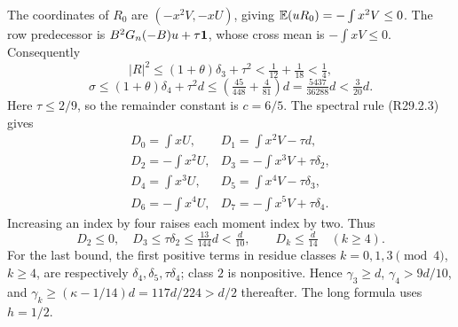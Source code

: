 The coordinates of \(R_0\) are \((-x^2V,-xU)\), giving
\(\mathbb E(uR_0)=-\int x^2V\le0\). The row predecessor is
\(B^2G_n(-B)u+\tau\mathbf1\), whose cross mean is
\(-\int xV\le0\). Consequently
\[
 |R|^2\le(1+\theta)\delta_3+\tau^2
 <\tfrac1{12}+\tfrac1{18}<\tfrac14,
\]
\begin{equation}\tag{R31.8.3}\label{eq:oc:R31:8.3}
 \sigma\le(1+\theta)\delta_4+\tau^2d
 \le\left(\tfrac{45}{448}+\tfrac4{81}\right)d
 =\tfrac{5437}{36288}d<\tfrac3{20}d.
\end{equation}
Here \(\tau\le2/9\), so the remainder constant is \(c=6/5\).
The spectral rule (R29.2.3) gives
\begin{equation}\tag{R31.8.4}\label{eq:oc:R31:8.4}
 \begin{array}{ll}
 D_0=\int xU,&D_1=\int x^2V-\tau d,\\
 D_2=-\int x^2U,&D_3=-\int x^3V+\tau\delta_2,\\
 D_4=\int x^3U,&D_5=\int x^4V-\tau\delta_3,\\
 D_6=-\int x^4U,&D_7=-\int x^5V+\tau\delta_4.
 \end{array}
\end{equation}
Increasing an index by four raises each moment index by two. Thus
\begin{equation}\tag{R31.8.5}\label{eq:oc:R31:8.5}
 D_2\le0,\quad D_3\le\tau\delta_2\le\tfrac{13}{144}d<\tfrac d{10},
 \qquad D_k\le\tfrac d{14}\quad(k\ge4).
\end{equation}
For the last bound, the first positive terms in residue classes
\(k=0,1,3\pmod4\), \(k\ge4\), are respectively
\(\delta_4,\delta_5,\tau\delta_4\); class \(2\) is nonpositive.
Hence \(\gamma_3\ge d\), \(\gamma_4>9d/10\), and
\(\gamma_k\ge(\kappa-1/14)d=117d/224>d/2\) thereafter.
The long formula uses \(h=1/2\).


